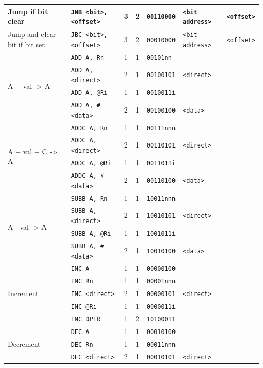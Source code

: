 \documentclass[journal]{IEEEtran}
\begin{document}
{{\begin{tabular}{|l|l|l|l|l|l|l|}
		\hline
		Jump if bit clear
		& \texttt{JNB <bit>, <offset>} & 3 & 2 & \texttt{00110000} & \texttt{<bit address>} & \texttt{<offset>} \\
		\hline
		Jump and clear bit if bit set
		& \texttt{JBC <bit>, <offset>} & 3 & 2 & \texttt{00010000} & \texttt{<bit address>} & \texttt{<offset>} \\
		\hline
		\multirow{4}{*}{A + val -> A}
		& \texttt{ADD A, Rn} & 1 & 1 & \texttt{00101nn} & & \\
		& \texttt{ADD A, <direct>} & 2 & 1 & \texttt{00100101} & \texttt{<direct>} & \\
		& \texttt{ADD A, @Ri} & 1 & 1 & \texttt{0010011i} & & \\
		& \texttt{ADD A, \#<data>} & 2 & 1 & \texttt{00100100} & \texttt{<data>} & \\
		\hline
		\multirow{4}{*}{A + val + C -> A}
		& \texttt{ADDC A, Rn} & 1 & 1 & \texttt{00111nnn} & & \\
		& \texttt{ADDC A, <direct>} & 2 & 1 & \texttt{00110101} & \texttt{<direct>} & \\
		& \texttt{ADDC A, @Ri} & 1 & 1 & \texttt{0011011i} & & \\
		& \texttt{ADDC A, \#<data>} & 2 & 1 & \texttt{00110100} & \texttt{<data>} & \\
		\hline
		\multirow{4}{*}{A - val -> A}
		& \texttt{SUBB A, Rn} & 1 & 1 & \texttt{10011nnn} & & \\
		& \texttt{SUBB A, <direct>} & 2 & 1 & \texttt{10010101} & \texttt{<direct>} & \\
		& \texttt{SUBB A, @Ri} & 1 & 1 & \texttt{1001011i} & & \\
		& \texttt{SUBB A, \#<data>} & 2 & 1 & \texttt{10010100} & \texttt{<data>} & \\
		\hline
		\multirow{5}{*}{Increment}
		& \texttt{INC A} & 1 & 1 & \texttt{00000100} & & \\
		& \texttt{INC Rn} & 1 & 1 & \texttt{00001nnn} & & \\
		& \texttt{INC <direct>} & 2 & 1 & \texttt{00000101} & \texttt{<direct>} & \\
		& \texttt{INC @Ri} & 1 & 1 & \texttt{0000011i} & & \\
		& \texttt{INC DPTR} & 1 & 2 & \texttt{10100011} & & \\
		\hline
		\multirow{4}{*}{Decrement}
		& \texttt{DEC A} & 1 & 1 & \texttt{00010100} & & \\
		& \texttt{DEC Rn} & 1 & 1 & \texttt{00011nnn} & & \\
		& \texttt{DEC <direct>} & 2 & 1 & \texttt{00010101} & \texttt{<direct>} & \\

\end{tabular}}}
\end{document}
